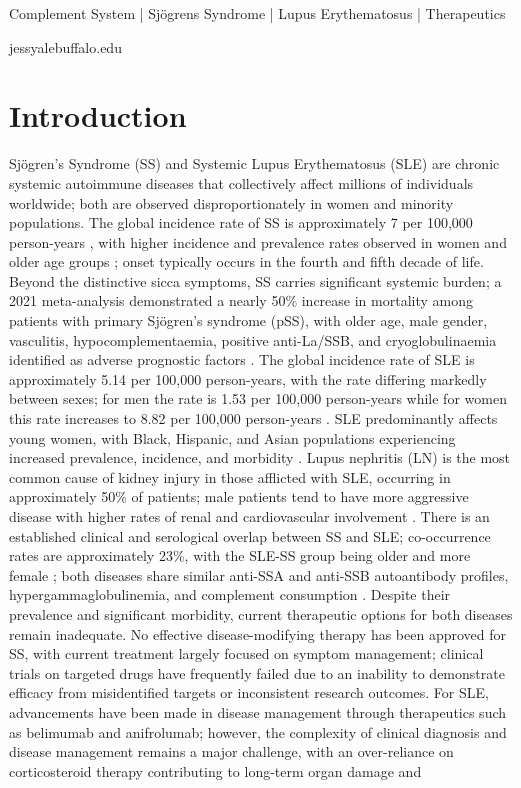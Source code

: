 \documentclass[times, twoside, watermark]{zHenriquesLab-StyleBioRxiv}
\begin{document}
Complement System | Sjögrens Syndrome | Lupus Erythematosus | Therapeutics

\begin{corrauthor}
jessyale\at buffalo.edu
\end{corrauthor}

\section*{Introduction}
	Sjögren's Syndrome (SS) and Systemic Lupus Erythematosus (SLE) are chronic systemic autoimmune diseases that collectively affect millions of individuals worldwide; both are observed disproportionately in women and minority populations. The global incidence rate of SS is approximately 7 per 100,000 person-years \cite{Reyes_Jaraba_2022}, with higher incidence and prevalence rates observed in women and older age groups \cite{Thurtle2024}; onset typically occurs in the fourth and fifth decade of life. Beyond the distinctive sicca symptoms, SS carries significant systemic burden; a 2021 meta-analysis demonstrated a nearly 50\% increase in mortality among patients with primary Sjögren's syndrome (pSS), with older age, male gender, vasculitis, hypocomplementaemia, positive anti-La/SSB, and cryoglobulinaemia identified as adverse prognostic factors \cite{10.1093/rheumatology/keab364}. The global incidence rate of SLE is approximately 5.14 per 100,000 person-years, with the rate differing markedly between sexes; for men the rate is 1.53 per 100,000 person-years while for women this rate increases to 8.82 per 100,000 person-years \cite{Tian_2023}. SLE predominantly affects young women, with Black, Hispanic, and Asian populations experiencing increased prevalence, incidence, and morbidity \cite{Barber_2021}. Lupus nephritis (LN) is the most common cause of kidney injury in those afflicted with SLE, occurring in approximately 50\% of patients; male patients tend to have more aggressive disease with higher rates of renal and cardiovascular involvement \cite{Parikh_2020}. There is an established clinical and serological overlap between SS and SLE; co-occurrence rates are approximately 23\%, with the SLE-SS group being older and more female \cite{ruacho:2020aa}; both diseases share similar anti-SSA and anti-SSB autoantibody profiles, hypergammaglobulinemia, and complement consumption \cite{Eriksson_2011}. Despite their prevalence and significant morbidity, current therapeutic options for both diseases remain inadequate. No effective disease-modifying therapy has been approved for SS, with current treatment largely focused on symptom management; clinical trials on targeted drugs have frequently failed due to an inability to demonstrate efficacy from misidentified targets or inconsistent research outcomes. For SLE, advancements have been made in disease management through therapeutics such as belimumab and anifrolumab; however, the complexity of clinical diagnosis and disease management remains a major challenge, with an over-reliance on corticosteroid therapy contributing to long-term organ damage and 
\end{document}
